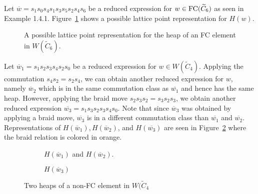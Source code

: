 \begin{example}
	Let $\overline{w}=s_1s_0s_4s_1s_3s_5s_2s_4s_6$ be a reduced expression for $w \in \mathrm{FC}(\widetilde{C}_6)$ as seen in Example 1.4.1. Figure~\ref{fig:FC heap} shows a possible lattice point representation for $H(w)$.
\begin{figure}[h]
\centering
{}
\caption{A possible lattice point representation for the heap of an FC element in $W(\widetilde{C}_6)$.}
\label{fig:FC heap}
\end{figure}
\end{example}

\begin{example}
Let $\overline{w}_1=s_1s_2s_3s_4s_2s_0$ be a reduced expression for $w \in W(\widetilde{C}_4)$. Applying the commutation $s_4s_2=s_2s_4$, we can obtain another reduced expression for $w$, namely $\overline{w}_2$ which is in the same commutation class as $\overline{w_1}$ and hence has the same heap. However, applying the braid move $s_2s_3s_2=s_3s_2s_3$, we obtain another reduced expression $\overline{w_3}=s_1s_3s_2s_3s_4s_0$. Note that since $\overline{w}_3$ was obtained by applying a braid move, $\overline{w_3}$ is in a different commutation class than $\overline{w_1}$ and $\overline{w_2}$. Representations of $H(\overline{w}_1), H(\overline{w}_2)$, and $H(\overline{w_3})$ are seen in Figure~\ref{fig:not FC} where the braid relation is colored in orange.

\begin{figure}[h]
\centering
\begin{subfigure}[b]{0.3\textwidth}	
\centering
{}
\caption{$H(\overline{w}_1)$ and $H(\overline{w}_2)$.}
\end{subfigure}
\begin{subfigure}[b]{0.3\textwidth}	
\centering
{}
\caption{$H(\overline{w}_3)$}
\end{subfigure}
\caption{Two heaps of a non-FC element in $W(\widetilde{C}_4$}	
\label{fig:not FC}
\end{figure}
\end{example}

